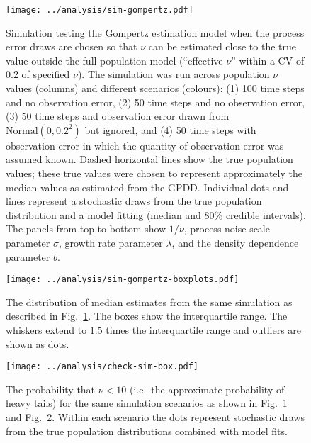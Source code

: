 \clearpage

\begin{figure}[htbp]
\begin{center}
\texttt{[image: ../analysis/sim-gompertz.pdf]}
\caption{
  Simulation testing the Gompertz estimation model when the process error draws
  are chosen so that $\nu$ can be estimated close to the true value outside the
  full population model (``effective $\nu$'' within a CV of 0.2 of specified
  $\nu$). The simulation was run across population $\nu$ values (columns) and
  different scenarios (colours): (1) 100 time steps and no observation error,
  (2) 50 time steps and no observation error, (3) 50 time steps and observation
  error drawn from $\mathrm{Normal} (0, 0.2^2)$ but ignored, and (4) 50 time
  steps with observation error in which the quantity of observation error was
  assumed known. Dashed horizontal lines show the true population values; these
  true values were chosen to represent approximately the median values as
  estimated from the GPDD. Individual dots and lines represent a stochastic
  draws from the true population distribution and a model fitting (median and
  80\% credible intervals). The panels from top to bottom show $1/\nu$, process
  noise scale parameter $\sigma$, growth rate parameter $\lambda$, and the
  density dependence parameter $b$.
}
\label{fig:sim-gompertz}
\end{center}
\end{figure}

\begin{figure}[htbp]
\begin{center}
\texttt{[image: ../analysis/sim-gompertz-boxplots.pdf]}
\caption{
  The distribution of median estimates from the same simulation as described in
  Fig.~\ref{fig:sim-gompertz}. The boxes show the interquartile range. The
  whiskers extend to $1.5$ times the interquartile range and outliers are shown
  as dots.
}
\label{fig:sim-gompertz-boxplots}
\end{center}
\end{figure}


\begin{figure}[htbp]
\begin{center}
\texttt{[image: ../analysis/check-sim-box.pdf]}
\caption{
  The probability that $\nu < 10$ (i.e.\ the approximate probability of heavy
  tails) for the same simulation scenarios as shown in
  Fig.~\ref{fig:sim-gompertz} and Fig.~\ref{fig:sim-gompertz-boxplots}. Within
  each scenario the dots represent stochastic draws from the true population
  distributions combined with model fits.
}
\label{fig:sim-prob}
\end{center}
\end{figure}


